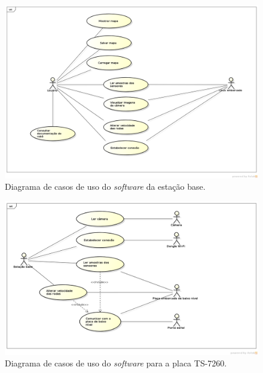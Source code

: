\begin{figure}[H]
  \centering
  \includegraphics[width=\textwidth, keepaspectratio]{./figuras/diagrama_caso_uso_estacao_base.png}
  \caption{Diagrama de casos de uso do \textit{software} da estação base.}
  \label{fig:diagrama_caso_uso_estacao_base}
\end{figure}

\begin{figure}[H]
  \centering
  \includegraphics[width=\textwidth, keepaspectratio]{./figuras/diagrama_caso_uso_linux_embarcado.png}
  \caption{Diagrama de casos de uso do \textit{software} para a placa TS-7260.}
  \label{fig:diagrama_caso_uso_linux_embarcado}
\end{figure}

